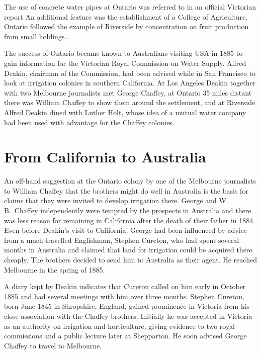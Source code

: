 The use of concrete water pipes at Ontario was referred to in an
official Victorian report An additional feature was the establishment
of a College of Agriculture.  Ontario followed the example of
Riverside by concentration on fruit production from small
holdings..

The success of Ontario became known to Australians visiting USA in
1885 to gain information for the Victorian Royal Commission on Water
Supply.  Alfred Deakin, chairman of the Commission, had been advised
while in San Francisco to look at irrigation colonies in southern
California.  At Los Angeles Deakin together with two Melbourne
journalists met George Chaffey, at Ontario 35 miles distant there was
William Chaffey to show them around the settlement, and at Riverside
Alfred Deakin dined with Luther Holt, whose idea of a mutual water
company had been used with advantage for the Chaffey
colonies.

\section*{From California to Australia}

An off-hand suggestion at the Ontario colony by one of the Melbourne
journalists to William Chaffey that the brothers might do well in
Australia is the basis for claims that they were invited to develop
irrigation there.  George and W.\,B.~Chaffey independently were
tempted by the prospects in Australia and there was less reason for
remaining in California after the death of their father in 1884.  Even
before Deakin's visit to California, George had been influenced by
advice from a much-travelled Englishman, Stephen Cureton, who had
spent several months in Australia and claimed that land for irrigation
could be acquired there cheaply.  The brothers decided to send him to
Australia as their agent.  He reached Melbourne in the spring of
1885.

A diary kept by Deakin indicates that Cureton called on him early in
October 1885 and had several meetings with him over three months.
Stephen Cureton, born June 1845 in Shropshire, England, gained
prominence in Victoria from his close association with the Chaffey
brothers.  Initially he was accepted in Victoria as an authority on
irrigation and horticulture, giving evidence to two royal commissions
and a public lecture later at Shepparton.  He soon advised George
Chaffey to travel to Melbourne.

